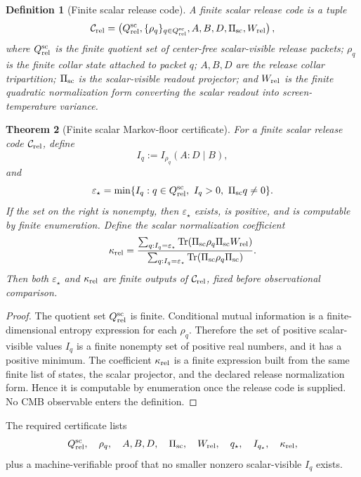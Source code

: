 \documentclass[11pt]{article}
\newtheorem{theorem}{Theorem}[section]
\newtheorem{definition}[theorem]{Definition}
\begin{document}
\begin{definition}[Finite scalar release code]\label{def:finite-scalar-release-code}
A finite scalar release code is a tuple
\[
\mathcal C_{\rm rel}
=
\left(
Q_{\rm rel}^{\rm sc},
\{\rho_q\}_{q\in Q_{\rm rel}^{\rm sc}},
A,B,D,
\Pi_{\rm sc},
W_{\rm rel}
\right),
\]
where \(Q_{\rm rel}^{\rm sc}\) is the finite quotient set of center-free scalar-visible release
packets; \(\rho_q\) is the finite collar state attached to packet \(q\); \(A,B,D\) are the release
collar tripartition; \(\Pi_{\rm sc}\) is the scalar-visible readout projector; and \(W_{\rm rel}\)
is the finite quadratic normalization form converting the scalar readout into screen-temperature
variance.
\end{definition}

\begin{theorem}[Finite scalar Markov-floor certificate]\label{thm:epsilon-star-cert}
For a finite scalar release code \(\mathcal C_{\rm rel}\), define
\[
I_q:=I_{\rho_q}(A:D\mid B),
\]
and
\[
\varepsilon_\star
=
\min\{I_q:q\in Q_{\rm rel}^{\rm sc},\ I_q>0,\ \Pi_{\rm sc}q\ne0\}.
\]
If the set on the right is nonempty, then \(\varepsilon_\star\) exists, is positive, and is
computable by finite enumeration. Define the scalar normalization coefficient
\[
\kappa_{\rm rel}
=
\frac{
\sum_{q:I_q=\varepsilon_\star}
\operatorname{Tr}(\Pi_{\rm sc}\rho_q\Pi_{\rm sc}W_{\rm rel})
}{
\sum_{q:I_q=\varepsilon_\star}
\operatorname{Tr}(\Pi_{\rm sc}\rho_q\Pi_{\rm sc})
}.
\]
Then both \(\varepsilon_\star\) and \(\kappa_{\rm rel}\) are finite outputs of
\(\mathcal C_{\rm rel}\), fixed before observational comparison.
\end{theorem}

\begin{proof}
The quotient set \(Q_{\rm rel}^{\rm sc}\) is finite. Conditional mutual information is a
finite-dimensional entropy expression for each \(\rho_q\). Therefore the set of positive
scalar-visible values \(I_q\) is a finite nonempty set of positive real numbers, and it has a
positive minimum. The coefficient \(\kappa_{\rm rel}\) is a finite expression built from the same
finite list of states, the scalar projector, and the declared release normalization form. Hence it
is computable by enumeration once the release code is supplied. No CMB observable enters the
definition.
\end{proof}

The required certificate lists
\[
Q_{\rm rel}^{\rm sc},\quad
\rho_q,\quad
A,B,D,\quad
\Pi_{\rm sc},\quad
W_{\rm rel},\quad
q_\star,\quad
I_{q_\star},\quad
\kappa_{\rm rel},
\]
plus a machine-verifiable proof that no smaller nonzero scalar-visible \(I_q\) exists.
\end{document}
